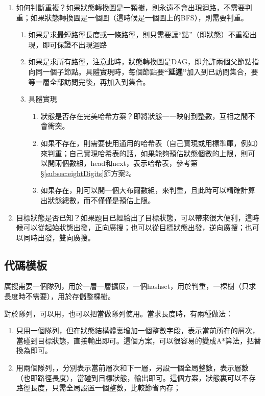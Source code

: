 \begin{enumerate}
\item 如何判斷重複？如果狀態轉換圖是一顆樹，則永遠不會出現迴路，不需要判重；如果狀態轉換圖是一個圖（這時候是一個圖上的BFS），則需要判重。
    \begin{enumerate}
    \item 如果是求最短路徑長度或一條路徑，則只需要讓“點”（即狀態）不重複出現，即可保證不出現迴路
    \item 如果是求所有路徑，注意此時，狀態轉換圖是DAG，即允許兩個父節點指向同一個子節點。具體實現時，每個節點要\textbf{“延遲”}加入到已訪問集合，要等一層全部訪問完後，再加入到集合。
    \item 具體實現
        \begin{enumerate}
        \item 狀態是否存在完美哈希方案？即將狀態一一映射到整數，互相之間不會衝突。
        \item 如果不存在，則需要使用通用的哈希表（自己實現或用標準庫，例如）來判重；自己實現哈希表的話，如果能夠預估狀態個數的上限，則可以開兩個數組，head和next，表示哈希表，參考第 \S \ref{subsec:eightDigits}節方案2。
        \item 如果存在，則可以開一個大布爾數組，來判重，且此時可以精確計算出狀態總數，而不僅僅是預估上限。
        \end{enumerate}
    \end{enumerate}

\item 目標狀態是否已知？如果題目已經給出了目標狀態，可以帶來很大便利，這時候可以從起始狀態出發，正向廣搜；也可以從目標狀態出發，逆向廣搜；也可以同時出發，雙向廣搜。
\end{enumerate}


\subsection{代碼模板}
廣搜需要一個隊列，用於一層一層擴展，一個hashset，用於判重，一棵樹（只求長度時不需要），用於存儲整棵樹。

對於隊列，可以用，也可以把當做隊列使用。當求長度時，有兩種做法：
\begin{enumerate}
\item 只用一個隊列，但在狀態結構體裏增加一個整數字段，表示當前所在的層次，當碰到目標狀態，直接輸出即可。這個方案，可以很容易的變成A*算法，把替換為即可。
\item 用兩個隊列，，分別表示當前層次和下一層，另設一個全局整數，表示層數（也即路徑長度），當碰到目標狀態，輸出即可。這個方案，狀態裏可以不存路徑長度，只需全局設置一個整數，比較節省內存；
\end{enumerate}

